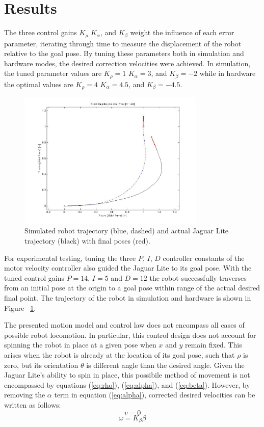 \documentclass[conference]{IEEEtran}
\begin{document}
\section{Results}

The three control gains $K_{\rho}$ $K_{\alpha}$, and $K_{\beta}$ weight the influence 
of each error parameter, iterating through time to measure the displacement of the robot
relative to the goal pose. By tuning these parameters both in simulation and hardware modes, 
the desired correction velocities were achieved. In simulation, the tuned parameter values are 
$K_{\rho} = 1$ $K_{\alpha} =  3$, and $K_{\beta} = -2$ while in hardware the optimal values 
are $K_{\rho} = 4$ $K_{\alpha} =  4.5$, and $K_{\beta} = -4.5$.

\begin{figure}[b]
\centering
\includegraphics[width = 3.5in]{trajectory.jpg}
\caption{Simulated robot trajectory (blue, dashed) and actual Jaguar Lite trajectory (black) with final poses (red).}
\label{fig4}
\end{figure}

For experimental testing, tuning the three $P$, $I$, $D$
controller constants of the motor velocity controller also guided the Jaguar Lite to its goal pose. 
With the tuned control gains $P = 14$, $I = 5$ and $D = 12$ the robot successfully traverses from an initial pose at the origin to a goal pose within range of the 
actual desired final point. The trajectory of the robot in simulation and hardware is shown in Figure ~\ref{fig4}.

The presented motion model and control law does not encompass all cases of possible robot 
locomotion. In particular, this control design does not account for spinning the robot in place at a 
given pose when $x$ and $y$ remain fixed.  This arises when the robot is already at the location 
of its goal pose, such that $\rho$ is zero, but its orientation $\theta$ is different angle than the desired angle.  Given the 
Jaguar Lite's ability to spin in place, this possibile method of movement is not encompassed by equations
 (\ref{eq:rho}), (\ref{eq:alpha}), and (\ref{eq:beta}).  
However, by removing the $\alpha$ term in equation (\ref{eq:alpha}), corrected desired velocities 
can be written as follows:
\begin{equation} 
v = 0
\end{equation}
\begin{equation}
\omega = K_{\beta} \beta 
\end{equation}
\end{document}
